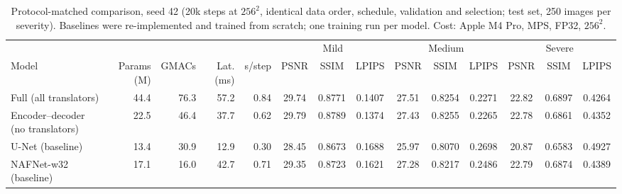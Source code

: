 \begin{table}[t]
\centering
\caption{Protocol-matched comparison, seed 42 (20k steps at $256^2$, identical data order, schedule, validation and selection; test set, 250 images per severity). Baselines were re-implemented and trained from scratch; one training run per model. Cost: Apple M4 Pro, MPS, FP32, $256^2$.}
\label{tab:baselines}
\scriptsize
\setlength{\tabcolsep}{2.5pt}
\begin{tabular}{lrrrrccccccccc}
\toprule
 & & & & & \multicolumn{3}{c}{Mild} & \multicolumn{3}{c}{Medium} & \multicolumn{3}{c}{Severe} \\
\cmidrule(lr){6-8}\cmidrule(lr){9-11}\cmidrule(lr){12-14}
Model & Params (M) & GMACs & Lat. (ms) & s/step & PSNR & SSIM & LPIPS & PSNR & SSIM & LPIPS & PSNR & SSIM & LPIPS \\
\midrule
Full (all translators) & 44.4 & 76.3 & 57.2 & 0.84 & 29.74 & 0.8771 & 0.1407 & 27.51 & 0.8254 & 0.2271 & 22.82 & 0.6897 & 0.4264 \\
Encoder--decoder (no translators) & 22.5 & 46.4 & 37.7 & 0.62 & 29.79 & 0.8789 & 0.1374 & 27.43 & 0.8255 & 0.2265 & 22.78 & 0.6861 & 0.4352 \\
U-Net (baseline) & 13.4 & 30.9 & 12.9 & 0.30 & 28.45 & 0.8673 & 0.1688 & 25.97 & 0.8070 & 0.2698 & 20.87 & 0.6583 & 0.4927 \\
NAFNet-w32 (baseline) & 17.1 & 16.0 & 42.7 & 0.71 & 29.35 & 0.8723 & 0.1621 & 27.28 & 0.8217 & 0.2486 & 22.79 & 0.6874 & 0.4389 \\
\bottomrule
\end{tabular}
\end{table}
